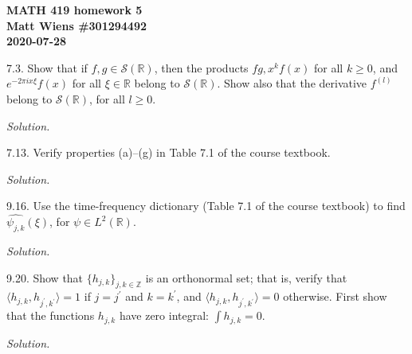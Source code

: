 \documentclass{article}
\newcommand{\R}{\mathbb{R}}
\newcommand{\Z}{\mathbb{Z}}
\newcommand{\fS}{\mathcal{S}}
\begin{document}
\textbf{MATH 419 homework 5} \\
\textbf{Matt Wiens \#301294492} \\
\textbf{2020-07-28}

7.3. Show that if $f, g \in \fS(\R)$, then the products
$fg, x^kf(x)$ for all $k \geq 0$, and $e^{-2 \pi i x \xi}f(x)$
for all $\xi \in \R$ belong to $\fS(\R)$. Show also that the
derivative $f^{(l)}$ belong to $\fS(\R)$, for all $l \geq 0$.

\textit{Solution.}

\newpage

7.13. Verify properties (a)--(g) in Table 7.1 of the course textbook.

\textit{Solution.}

\newpage

9.16. Use the time-frequency dictionary (Table 7.1 of the course textbook)
to find $\widehat{\psi_{j,k}}(\xi)$, for $\psi \in L^2(\R)$.

\textit{Solution.}

\newpage

9.20. Show that $\{h_{j,k}\}_{j,k \in \Z}$ is an orthonormal set; that is,
verify that $\langle h_{j,k}, h_{j^\prime,k^\prime} \rangle = 1$ if
$j = j^\prime$ and $k = k^\prime$, and
$\langle h_{j,k}, h_{j^\prime,k^\prime} \rangle = 0$ otherwise. First show that
the functions $h_{j,k}$ have zero integral: $\int h_{j,k} = 0$.

\textit{Solution.}
\end{document}

